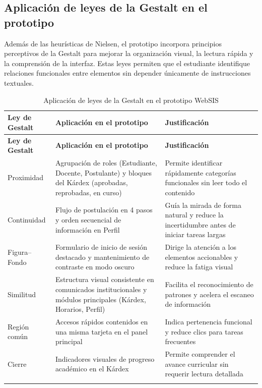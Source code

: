 \subsection{Aplicación de leyes de la Gestalt en el prototipo}

Además de las heurísticas de Nielsen, el prototipo incorpora principios perceptivos de la Gestalt para mejorar la organización visual, la lectura rápida y la comprensión de la interfaz. Estas leyes permiten que el estudiante identifique relaciones funcionales entre elementos sin depender únicamente de instrucciones textuales.

{\small
\setlength{\tabcolsep}{4pt}
\renewcommand{\arraystretch}{1.25}
\begin{longtable}{|p{3cm}|p{5.8cm}|p{5.8cm}|}
\hline
\textbf{Ley de Gestalt} & \textbf{Aplicación en el prototipo} & \textbf{Justificación} \\
\hline
\endfirsthead

\hline
\textbf{Ley de Gestalt} & \textbf{Aplicación en el prototipo} & \textbf{Justificación} \\
\hline
\endhead

Proximidad & Agrupación de roles (Estudiante, Docente, Postulante) y bloques del Kárdex (aprobadas, reprobadas, en curso) & Permite identificar rápidamente categorías funcionales sin leer todo el contenido \\
\hline

Continuidad & Flujo de postulación en 4 pasos y orden secuencial de información en Perfil & Guía la mirada de forma natural y reduce la incertidumbre antes de iniciar tareas largas \\
\hline

Figura--Fondo & Formulario de inicio de sesión destacado y mantenimiento de contraste en modo oscuro & Dirige la atención a los elementos accionables y reduce la fatiga visual \\
\hline

Similitud & Estructura visual consistente en comunicados institucionales y módulos principales (Kárdex, Horarios, Perfil) & Facilita el reconocimiento de patrones y acelera el escaneo de información \\
\hline

Región común & Accesos rápidos contenidos en una misma tarjeta en el panel principal & Indica pertenencia funcional y reduce clics para tareas frecuentes \\
\hline

Cierre & Indicadores visuales de progreso académico en el Kárdex & Permite comprender el avance curricular sin requerir lectura detallada \\
\hline
\caption{Aplicación de leyes de la Gestalt en el prototipo WebSIS}\label{tab:leyes-gestalt-prototipo}
\end{longtable}
}
